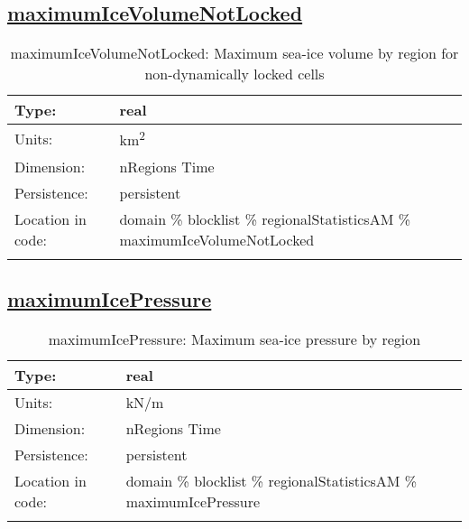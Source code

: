 \subsection[maximumIceVolumeNotLocked]{\hyperref[sec:var_tab_regionalStatisticsAM]{maximumIceVolumeNotLocked}}
\label{subsec:var_sec_regionalStatisticsAM_maximumIceVolumeNotLocked}
\begin{center}
\begin{longtable}{| p{2.0in} | p{4.0in} |}
        \hline 
        Type: & real \\
        \hline 
        Units: & \si{km^2} \\
        \hline 
        Dimension: & nRegions Time \\
        \hline 
        Persistence: & persistent \\
        \hline 
         Location in code: & domain \% blocklist \% regionalStatisticsAM \% maximumIceVolumeNotLocked \\
         \hline 
    \caption{maximumIceVolumeNotLocked: Maximum sea-ice volume by region for non-dynamically locked cells}
\end{longtable}
\end{center}
\subsection[maximumIcePressure]{\hyperref[sec:var_tab_regionalStatisticsAM]{maximumIcePressure}}
\label{subsec:var_sec_regionalStatisticsAM_maximumIcePressure}
\begin{center}
\begin{longtable}{| p{2.0in} | p{4.0in} |}
        \hline 
        Type: & real \\
        \hline 
        Units: & \si{kN/m} \\
        \hline 
        Dimension: & nRegions Time \\
        \hline 
        Persistence: & persistent \\
        \hline 
         Location in code: & domain \% blocklist \% regionalStatisticsAM \% maximumIcePressure \\
         \hline 
    \caption{maximumIcePressure: Maximum sea-ice pressure by region}
\end{longtable}
\end{center}
